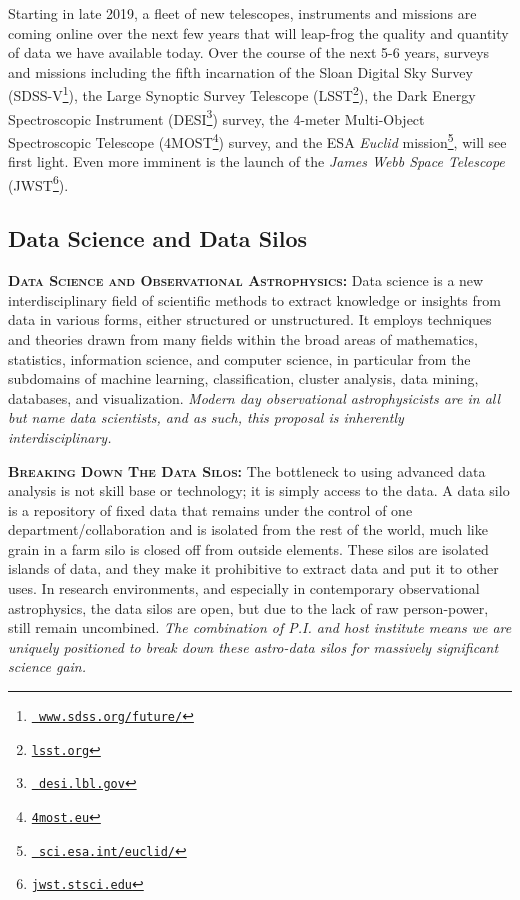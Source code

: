 \smallskip
\smallskip
\noindent
Starting in late 2019, a fleet of new telescopes, instruments and
missions are coming online over the next few years that will leap-frog
the quality and quantity of data we have available today. Over the
course of the next 5-6 years, surveys and missions including the fifth
incarnation of the Sloan Digital Sky Survey
(SDSS-V\footnote{\href{www.sdss.org/future/}{{\tt
www.sdss.org/future/}}}), the Large Synoptic Survey Telescope
(LSST\footnote{\href{lsst.org}{{\tt lsst.org}}}), the Dark Energy
Spectroscopic Instrument (DESI\footnote{\href{desi.lbl.gov}{{\tt
desi.lbl.gov}}}) survey, the 4-meter Multi-Object Spectroscopic
Telescope (4MOST\footnote{\href{4most.eu}{{\tt 4most.eu}}}) survey,
and the ESA {\it Euclid}
mission\footnote{\href{sci.esa.int/euclid/}{{\tt
sci.esa.int/euclid/}}}, will see first light. Even more imminent is
the launch of the {\it James Webb Space Telescope}
(JWST\footnote{\href{jwst.stsci.edu}{{\tt jwst.stsci.edu}}}).

%




\smallskip
\smallskip
\noindent



\subsection{Data Science and Data Silos}
\smallskip
\smallskip
\noindent
\textbf{\textsc{{Data Science and Observational Astrophysics: }}}
Data science is a new interdisciplinary field of scientific methods to
extract knowledge or insights from data in various forms, either
structured or unstructured. It employs techniques and theories drawn
from many fields within the broad areas of mathematics, statistics,
information science, and computer science, in particular from the
subdomains of machine learning, classification, cluster analysis, data
mining, databases, and visualization.  {\it Modern day observational
astrophysicists are in all but name data scientists, and as such, this
proposal is inherently interdisciplinary.}

\smallskip
\smallskip
\noindent
\textbf{\textsc{Breaking Down The Data Silos: }}
The bottleneck to using advanced data analysis is not skill base or
technology; it is simply access to the data.  A data silo is a
repository of fixed data that remains under the control of one
department/collaboration and is isolated from the rest of the world,
much like grain in a farm silo is closed off from outside
elements. These silos are isolated islands of data, and they make it
prohibitive to extract data and put it to other uses. In research
environments, and especially in contemporary observational
astrophysics, the data silos are open, but due to the lack of raw
person-power, still remain uncombined. {\it The combination of P.I. and
host institute means we are uniquely positioned to break down these
astro-data silos for massively significant science gain.}



